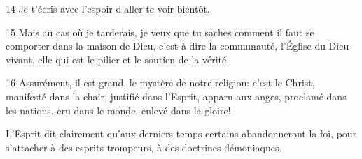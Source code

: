 
14 Je t’écris avec l’espoir d’aller te voir bientôt.

15 Mais au cas où je tarderais, je veux que tu saches comment il faut se comporter dans la maison de Dieu, c’est-à-dire la communauté, l’Église du Dieu vivant, elle qui est le pilier et le soutien de la vérité.

16 Assurément, il est grand, le mystère de notre religion: c’est le Christ, manifesté dans la chair, justifié dans l’Esprit, apparu aux anges, proclamé dans les nations, cru dans le monde, enlevé dans la gloire!

L’Esprit dit clairement qu’aux derniers temps certains abandonneront la foi, pour s’attacher à des esprits trompeurs, à des doctrines démoniaques.